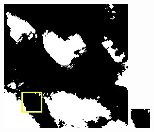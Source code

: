 \documentclass[10pt,UTF8,fntef]{ctexart}
\begin{document}
\begin{figure}[H]
{{\begin{minipage}[b]{0.15\linewidth}
            \includegraphics[width=1\linewidth]{../log/spoon3/cut/LC80290372013257LGN00_17086_segnet.jpg}\vspace{4pt}
            \includegraphics[width=1\linewidth]{../log/spoon3/cut/tmp_cut_LC80290372013257LGN00_17086_segnet.jpg}\vspace{4pt}

\end{minipage}}}
\end{figure}
\end{document}
